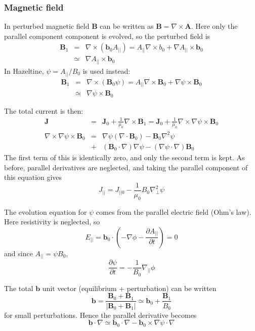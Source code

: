 \documentclass[12pt, a4paper]{article}
\newcommand{\deriv}[2]{\ensuremath{\frac{\partial #1}{\partial #2}}}
\newcommand{\apar}{\ensuremath{A_{||}}}
\newcommand{\Vec}[1]{\ensuremath{\mathbf{#1}}}
\newcommand{\bvec}{\Vec{b}}
\newcommand{\Bvec}{\Vec{B}}
\newcommand{\Jvec}{\Vec{J}}
\newcommand{\Jpar}{J_{||}}
\newcommand{\delp}{\nabla_\perp^2}
\newcommand{\Div}[1]{\ensuremath{\nabla\cdot #1 }}
\newcommand{\Curl}[1]{\ensuremath{\nabla\times #1 }}
\begin{document}
\subsubsection{Magnetic field}

In perturbed magnetic field $\Bvec$ can be written as $\Bvec = \Curl{\Vec{A}}$. Here only the parallel component
component is evolved, so the perturbed field is
\begin{eqnarray*}
\Bvec_1 &=& \Curl{\left(\bvec_0\apar\right)} = \apar\Curl{b_0} + \nabla\apar\times\bvec_0 \\
&\simeq& \nabla\apar\times\bvec_0
\end{eqnarray*}
In Hazeltine, $\psi = \apar / B_0$ is used instead:
\begin{eqnarray}
\Bvec_1 &=& \Curl{\left(\Bvec_0\psi\right)} = \apar\Curl{\Bvec_0} + \nabla\psi\times\Bvec_0 \nonumber \\
&\simeq& \nabla\psi\times\Bvec_0 \label{eq:psidef}
\end{eqnarray}


The total current is then:
\begin{eqnarray*}
\Jvec &=& \Jvec_0 + \frac{1}{\mu_0}\Curl{\Bvec_1} = \Jvec_0 + \frac{1}{\mu_0}\Curl{\nabla\psi\times\Bvec_0} \\
\Curl{\nabla\psi\times\Bvec_0} &=& \nabla\psi\left(\Div{\Bvec_0}\right) - \Bvec_0 \nabla^2\psi \\
&+& \left(\Bvec_0\cdot\nabla\right)\nabla\psi - \left(\nabla\psi\cdot\nabla\right)\Bvec_0
\end{eqnarray*}
The first term of this is identically zero, and only the second term is kept. 
As before, parallel derivatives are neglected, and taking the parallel component of this equation gives
\begin{equation}
\Jpar = J_{||0} - \frac{1}{\mu_0}B_0\delp\psi
\label{eq:jpar}
\end{equation}

The evolution equation for $\psi$ comes from the parallel electric field (Ohm's law). Here resistivity
is neglected, so
\[
E_{||} = \bvec_0\cdot\left(-\nabla\phi - \deriv{\apar}{t}\right) = 0
\]
and since $\apar = \psi B_0$,
\begin{equation}
\deriv{\psi}{t} = -\frac{1}{B_0}\nabla_{||}\phi
\label{eq:psievolve}
\end{equation}

The total $\bvec$ unit vector (equilibrium + perturbation) can be written
\[
\bvec = \frac{\Bvec_0 + \Bvec_1}{\left|\Bvec_0 + \Bvec_1\right|} \simeq \bvec_0 + \frac{\Bvec_1}{B_0}
\]
for small perturbations. Hence the parallel derivative becomes
\[
\bvec\cdot\nabla \simeq \bvec_0\cdot\nabla - \bvec_0\times\nabla\psi\cdot\nabla
\]
\end{document}
